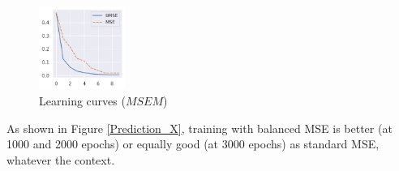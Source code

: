 \documentclass{article}
\def \w {\widehat}
\theoremstyle{definition}
\begin{document}
\begin{figure}[ht]
     \centering
         \includegraphics[width=0.25\textwidth]{imgs/Illu/1000Epochs/Imb/Learning_curves.png}
         \caption{Learning curves ($MSEM$)}
         \label{Learning_curves}
\end{figure}




As shown in %
Figure \ref{Prediction_X}, training with balanced MSE is better (at 1000 and 2000 epochs) or equally good (at 3000 epochs) as standard MSE, whatever the context.
\end{document}
